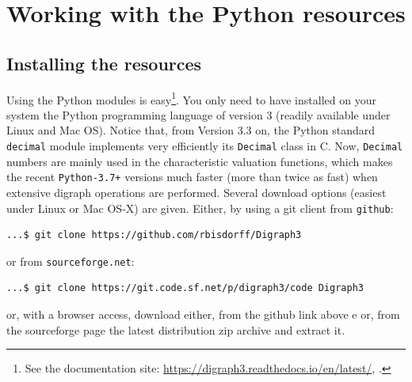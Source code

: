 %
%
%
\chapter{Working with the \Digraph Python resources}
\label{sec:1} %



\section{Installing the \Digraph resources}
\label{sec:1.1}

Using the \Digraph Python modules is easy\footnote{See the \Digraph documentation site: \url{https://digraph3.readthedocs.io/en/latest/}, \citet{BIS-2021}.}. You only need to have installed on your system the Python programming language of version 3 (readily available under Linux and Mac OS). Notice that, from Version 3.3 on, the Python standard \texttt{decimal} module implements very efficiently its \texttt{Decimal} class in C. Now, \texttt{Decimal} numbers are mainly used in the \Digraph characteristic valuation functions, which makes the recent \texttt{Python-3.7+} versions much faster (more than twice as fast) when extensive digraph operations are performed.
Several download options (easiest under Linux or Mac OS-X) are given. Either, by using a git client from \texttt{github}:
\begin{lstlisting}[language=sh, backgroundcolor=\color{White}, numbers=none]
  ...$ git clone https://github.com/rbisdorff/Digraph3
\end{lstlisting}
or from \texttt{sourceforge.net}:
\begin{lstlisting}[language=sh,backgroundcolor=\color{White},numbers=none]
  ...$ git clone https://git.code.sf.net/p/digraph3/code Digraph3
\end{lstlisting}
or, with a browser access, download either, from the github link above e or, from the sourceforge page the latest distribution zip archive and extract it.


